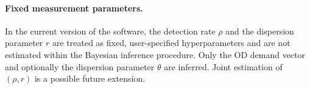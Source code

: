 \paragraph{Fixed measurement parameters.}
In the current version of the software, the detection rate $\rho$ and the dispersion parameter $r$ are treated as fixed, user-specified
hyperparameters and are not estimated within the Bayesian inference procedure.
 Only the OD demand vector and optionally the dispersion
parameter $\theta$ are inferred. Joint estimation of $(\rho,r)$ is a possible future extension.

